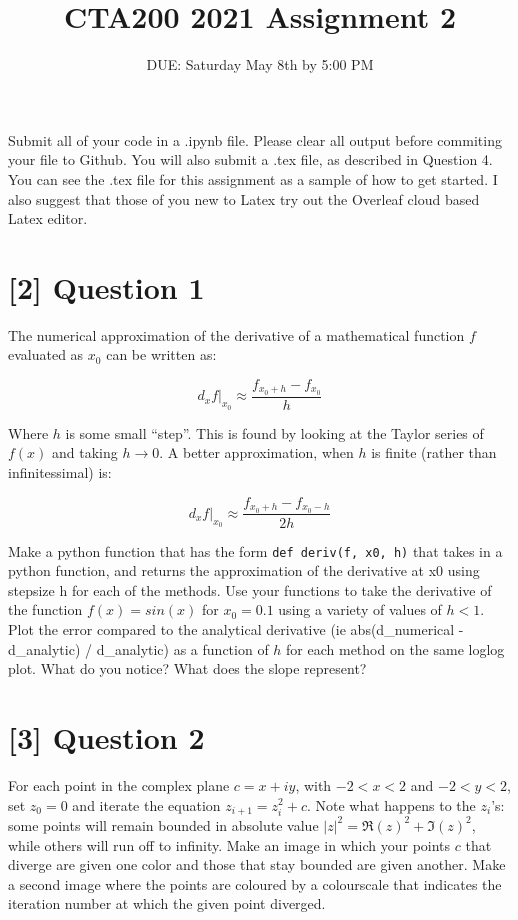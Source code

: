 \documentclass{article}
\title{CTA200 2021 Assignment 2}
\author{DUE: Saturday May 8th by 5:00 PM}
\date{}
\begin{document}
\maketitle

Submit all of your code in a .ipynb file. Please clear all output before commiting your file to Github. You will also submit a .tex file, as described in Question 4. You can see the .tex file for this assignment as a sample of how to get started. I also suggest that those of you new to Latex try out the Overleaf cloud based Latex editor.

\section*{[2] Question 1}

The numerical approximation of the derivative of a mathematical function $f$ evaluated as $x_0$ can be written as:

$$ d_x f|_{x_0} \approx \frac{f_{x_0 + h} - f_{x_0}}{h} $$

Where $h$ is some small ``step''. This is found by looking at the Taylor series of $f(x)$ and taking $h \to 0$. A better approximation, when $h$ is finite (rather than infinitessimal) is:

$$ d_x f|_{x_0} \approx \frac{f_{x_0 + h} - f_{x_0 - h}}{2h} $$

Make a python function that has the form \texttt{def deriv(f, x0, h)} that takes in a python function, and returns the approximation of the derivative at x0 using stepsize h for each of the methods.
Use your functions to take the derivative of the function $f(x) = sin(x)$ for $x_0 = 0.1$ using a variety of values of $h < 1$.
Plot the error compared to the analytical derivative (ie abs(d\_numerical - d\_analytic) / d\_analytic) as a function of $h$ for each method on the same loglog plot.
What do you notice? What does the slope represent?

\section*{[3] Question 2}

For each point in the complex plane $c = x + iy$, with $-2 < x < 2$ and $-2 < y < 2$, set $z_0 = 0$ and iterate the equation $z_{i + 1} = z_i^2 + c$. 
Note what happens to the $z_i$'s: some points will remain bounded in absolute value $|z|^2 = \Re(z)^2 + \Im(z)^2$, while others will run off to infinity. 
Make an image  in which your points $c$ that diverge are given one color and those that stay bounded are given another.
Make a second image where the points are coloured by a colourscale that indicates the iteration number at which the given point diverged.
\end{document}
